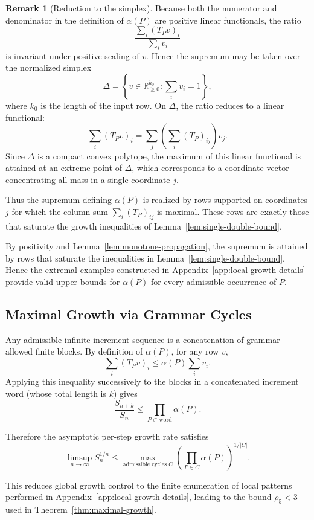 \documentclass[12pt, oneside]{article}   	%
\numberwithin{equation}{section}          %
\theoremstyle{definition}
\newtheorem*{remark}{Remark}
\begin{document}
\begin{remark}[Reduction to the simplex]
Because both the numerator and denominator in the definition of $\alpha(P)$ are
positive linear functionals, the ratio
\[
\frac{\sum_i (T_P v)_i}{\sum_i v_i}
\]
is invariant under positive scaling of $v$.  Hence the supremum may be taken over
the normalized simplex
\[
\Delta = \left\{ v \in \mathbb{R}^{k_0}_{\ge 0} : \sum_i v_i = 1 \right\},
\]
where $k_0$ is the length of the input row. On $\Delta$, the ratio reduces to a linear functional:
\[
\sum_i (T_P v)_i
= \sum_j \left( \sum_i (T_P)_{ij} \right) v_j.
\]
Since $\Delta$ is a compact convex polytope, the maximum of this linear functional
is attained at an extreme point of $\Delta$, which corresponds to a coordinate
vector concentrating all mass in a single coordinate $j$.

Thus the supremum defining $\alpha(P)$ is realized by rows supported on coordinates
$j$ for which the column sum $\sum_i (T_P)_{ij}$ is maximal.  These rows are exactly
those that saturate the growth inequalities of
Lemma~\ref{lem:single-double-bound}.
\end{remark}

By positivity and Lemma~\ref{lem:monotone-propagation},
the supremum is attained by rows that saturate the inequalities in
Lemma~\ref{lem:single-double-bound}. Hence the extremal examples constructed in
Appendix~\ref{app:local-growth-details} provide valid upper bounds for
$\alpha(P)$ for every admissible occurrence of $P$.


\subsection{Maximal Growth via Grammar Cycles}

Any admissible infinite increment sequence is a concatenation of
grammar-allowed finite blocks.  By definition of $\alpha(P)$, for any row $v$,
\[
\sum_i (T_P v)_i \le \alpha(P)\sum_i v_i.
\]
Applying this inequality successively to the blocks in a concatenated
increment word (whose total length is $k$) gives
\[
\frac{S_{n+k}}{S_n}
\le
\prod_{P\subset \text{word}} \alpha(P).
\]

Therefore the asymptotic per-step growth rate satisfies
\[
\limsup_{n\to\infty} S_n^{1/n}
\le
\max_{\text{admissible cycles } C}
\left( \prod_{P\in C} \alpha(P) \right)^{1/|C|}.
\]

This reduces global growth control to the finite enumeration of local
patterns performed in Appendix~\ref{app:local-growth-details}, leading to
the bound $\rho_5<3$ used in Theorem~\ref{thm:maximal-growth}.
\end{document}
